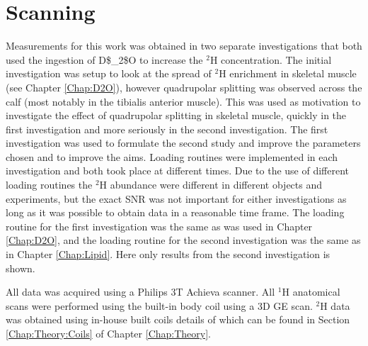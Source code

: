 \section{Scanning}

Measurements for this work was obtained in two separate investigations that both used the ingestion of \ac{D$_2$O} to increase the $^2$H concentration. The initial investigation was setup to look at the spread of $^2$H enrichment in skeletal muscle (see Chapter \ref{Chap:D2O}), however quadrupolar splitting was observed across the calf (most notably in the tibialis anterior muscle). This was used as motivation to investigate the effect of quadrupolar splitting in skeletal muscle, quickly in the first investigation and more seriously in the second investigation. The first investigation was used to formulate the second study and improve the parameters chosen and to improve the aims. Loading routines were implemented in each investigation and both took place at different times. Due to the use of different loading routines the $^2$H abundance were different in different objects and experiments, but the exact \ac{SNR} was not important for either investigations as long as it was possible to obtain data in a reasonable time frame. The loading routine for the first investigation was the same as was used in Chapter \ref{Chap:D2O}, and the loading routine for the second investigation was the same as in Chapter \ref{Chap:Lipid}. Here only results from the second investigation is shown.

All data was acquired using a Philips 3T Achieva scanner. All $^1$H anatomical scans were performed using the built-in body coil using a 3D \ac{GE} scan. $^2$H data was obtained using in-house built coils details of which can be found in Section \ref{Chap:Theory:Coils} of Chapter \ref{Chap:Theory}. 


